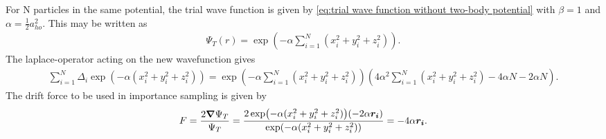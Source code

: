 For N particles in the same potential, the trial wave function is given by \autoref{eq:trial wave function without two-body potential}
with $\beta =1$ and $\alpha =\frac{1}{2}a^2 _{ho}$. This may be written as
\begin{gather*}
	\Psi_T(r) = \exp(-\alpha \sum_{i=1}^N (x_i^2 + y_i^2 + z_i^2)) .
\end{gather*}
The laplace-operator acting on the new wavefunction gives
\begin{gather*}
	\sum_{i=1}^{N} \Delta _{i} \exp(-\alpha (x_i^2+y_i^2+z_i^2)) = \exp(-\alpha \sum_{i=1}^N (x_i^2 + y_i^2 + z_i^2)) \left(4\alpha^2 \sum_{i=1}^N
	(x_i^2+y_i^2+z_i^2) - 4 \alpha N -2\alpha N \right).
\end{gather*}
The drift force to be used in importance sampling is given by
\begin{gather*}
	F = \frac{2 \grad \Psi _T}{\Psi _T} = \frac{2\exp(-\alpha (x_i^2+y_i^2+z_i^2))(-2\alpha \boldsymbol{r_i})}{\exp(-\alpha (x_i^2+y_i^2+z_i^2))}
	= -4\alpha \boldsymbol{r_i}.
\end{gather*}

